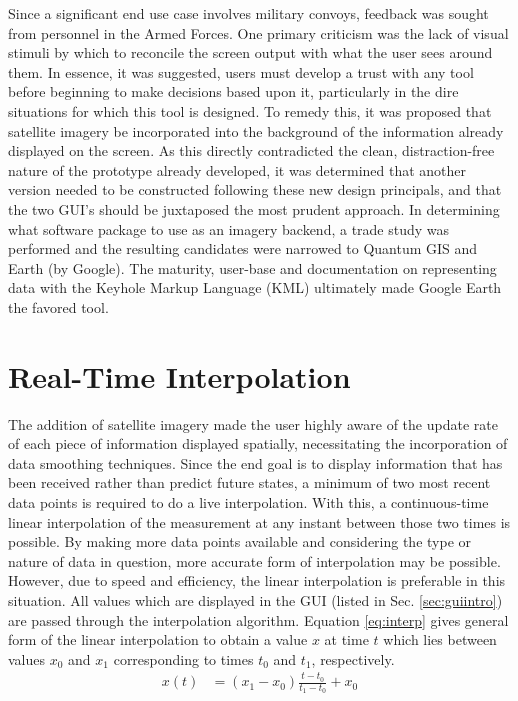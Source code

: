 Since a significant end use case involves military convoys, feedback was sought from personnel in the Armed Forces. One primary criticism was the lack of visual stimuli by which to reconcile the screen output with what the user sees around them. In essence, it was suggested, users must develop a trust with any tool before beginning to make decisions based upon it, particularly in the dire situations for which this tool is designed. To remedy this, it was proposed that satellite imagery be incorporated into the background of the information already displayed on the screen. As this directly contradicted the clean, distraction-free nature of the prototype already developed, it was determined that another version needed to be constructed following these new design principals, and that the two GUI's should be juxtaposed the most prudent approach. In determining what software package to use as an imagery backend, a trade study was performed and the resulting candidates were narrowed to Quantum GIS and Earth (by Google). The maturity, user-base and documentation on representing data with the Keyhole Markup Language (KML) ultimately made Google Earth the favored tool.

\section{Real-Time Interpolation} \label{sec:interp}
The addition of satellite imagery made the user highly aware of the update rate of each piece of information displayed spatially, necessitating the incorporation of data smoothing techniques. Since the end goal is to display information that has been received rather than predict future states, a minimum of two most recent data points is required to do a live interpolation. With this, a continuous-time linear interpolation of the measurement at any instant between those two times is possible. By making more data points available and considering the type or nature of data in question, more accurate form of interpolation may be possible. However, due to speed and efficiency, the linear interpolation is preferable in this situation. All values which are displayed in the GUI (listed in Sec. \ref{sec:guiintro}) are passed through the interpolation algorithm.
Equation \eqref{eq:interp} gives general form of the linear interpolation to obtain a value $x$ at time $t$ which lies between values $x_0$ and $x_1$ corresponding to times $t_0$ and $t_1$, respectively.
\begin{align} \label{eq:interp}
    x(t) &= (x_1 - x_0) \frac{ t - t_0 } { t_1 - t_0 } + x_0
\end{align}

